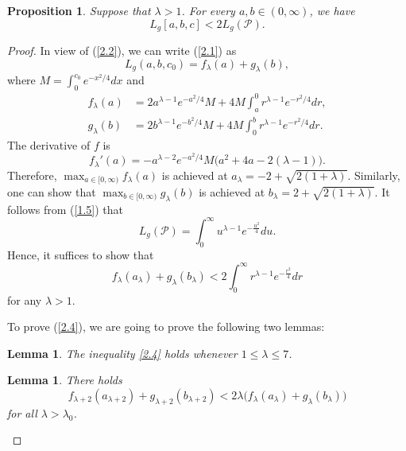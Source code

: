 \documentclass{amsart}
\newtheorem{lem}[theorem]{Lemma}
\theoremstyle{Corollary}
\newtheorem{prop}[theorem]{Proposition}
\numberwithin{equation}{section}
\begin{document}
\begin{prop}\label{prop9}
Suppose that $\lambda>1$.
For every $a,b\in (0,\infty)$, we have
$$L_g[a,b,c]<2L_g(\mathcal{P}).$$
\end{prop}
\begin{proof}
In view of (\ref{2.2}), we can write (\ref{2.1}) as
$$L_g(a,b,c_0)=f_\lambda(a)+g_\lambda(b),$$
where $M=\displaystyle\int_0^{c_0}e^{-x^2/4}dx$ and
\begin{equation*}
\begin{split}
f_\lambda(a)&=2a^{\lambda-1} e^{-a^2/4}M+4M\int_a^0r^{\lambda-1} e^{-r^2/4}dr,\\
g_\lambda(b)&=2b^{\lambda-1} e^{-b^2/4}M+4M\int_0^br^{\lambda-1} e^{-r^2/4}dr.
\end{split}
\end{equation*}
The derivative of $f$ is
$$f_\lambda'(a)=-a^{\lambda-2}e^{-a^2/4}M\big(a^2+4a-2(\lambda-1)\big).$$
Therefore, $\displaystyle\max_{a\in[0,\infty)}f_\lambda(a)$
is achieved at $a_\lambda=-2+\sqrt{2(1+\lambda)}$.
Similarly, one can show that
$\displaystyle\max_{b\in[0,\infty)}g_\lambda(b)$
is achieved at $b_\lambda=2+\sqrt{2(1+\lambda)}$.
It follows from (\ref{1.5}) that
$$L_g(\mathcal{P})=\int_0^\infty u^{\lambda-1} e^{-\frac{u^2}{4}}du.$$
Hence, it suffices to show that
\begin{equation}\label{2.4}
f_\lambda(a_{\lambda})+g_\lambda(b_\lambda)<2\int_0^\infty r^{\lambda-1} e^{-\frac{r^2}{4}}dr
\end{equation}
for any $\lambda>1$.

To prove (\ref{2.4}), we are going to prove the following two lemmas:


\begin{lem}\label{induction_lem}
The inequality \eqref{2.4} holds whenever $1\leq \lambda\leq 7$.
\end{lem}


\begin{lem}\label{lem10} There holds
\begin{equation}\label{2.3}
f_{\lambda+2}(a_{\lambda+2})+g_{\lambda+2}(b_{\lambda+2})
<2\lambda\big(f_{\lambda}(a_{\lambda})+g_{\lambda}(b_{\lambda})\big)
\end{equation}
for all $\lambda>\lambda_0$.
\end{lem}


\end{proof}
\end{document}

